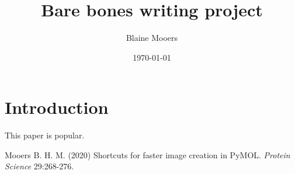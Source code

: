 \documentclass{article}
\title{\vspace {-2cm}Bare bones writing project}
\author{Blaine Mooers}
\date{\today}
\begin{document}
\maketitle

\section{Introduction}

This paper is popular\cite{Mooers2020ShortcutsForFasterImageCreationInPyMOL}.

\newpage

\begin{thebibliography}{99}
\newblock Mooers B. H. M.
\newblock (2020) 
\newblock Shortcuts for faster image creation in PyMOL. 
\newblock \emph{Protein Science} 29:268-276.
\end{thebibliography}
\end{document}
